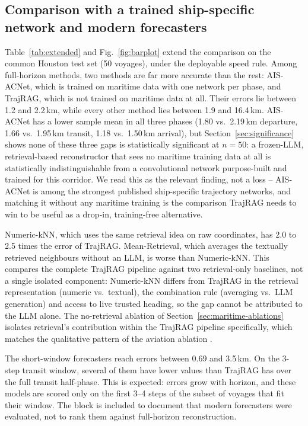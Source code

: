 \subsection{Comparison with a trained ship-specific network and modern forecasters}
\label{sec:extended-comparison}

Table~\ref{tab:extended} and Fig.~\ref{fig:barplot} extend the comparison on
the common Houston test set (50 voyages), under the deployable speed rule.
Among full-horizon methods, two methods are far more accurate than the
rest: AIS-ACNet, which is trained on maritime data with one network per
phase, and TrajRAG, which is not trained on maritime data at all. Their
errors lie between 1.2 and 2.2\,km, while every other method lies between
1.9 and 16.4\,km. AIS-ACNet has a lower sample mean in all three phases
(1.80 vs.\ 2.19\,km departure, 1.66 vs.\ 1.95\,km transit, 1.18 vs.\
1.50\,km arrival), but Section~\ref{sec:significance} shows none of these
three gaps is statistically significant at $n=50$: a frozen-LLM,
retrieval-based reconstructor that sees no maritime training data at all is
statistically indistinguishable from a convolutional network purpose-built
and trained for this corridor. We read this as the relevant finding, not a
loss -- AIS-ACNet is among the strongest published ship-specific
trajectory networks, and matching it without any maritime training is the
comparison TrajRAG needs to win to be useful as a drop-in, training-free
alternative.

Numeric-kNN, which uses the same retrieval idea on raw coordinates, has 2.0
to 2.5 times the error of TrajRAG. Mean-Retrieval, which averages the
textually retrieved neighbours without an LLM, is worse than Numeric-kNN.
This compares the complete TrajRAG pipeline against two retrieval-only
baselines, not a single isolated component: Numeric-kNN differs from
TrajRAG in the retrieval representation (numeric vs.\ textual), the
combination rule (averaging vs.\ LLM generation) and access to live trusted
heading, so the gap cannot be attributed to the LLM alone. The no-retrieval
ablation of Section~\ref{sec:maritime-ablations} isolates retrieval's
contribution within the TrajRAG pipeline specifically, which matches the
qualitative pattern of the aviation ablation \citep{felendler2026trajrag}.

The short-window forecasters reach errors between 0.69 and 3.5\,km. On the
3-step transit window, several of them have lower values than TrajRAG has
over the full transit half-phase. This is expected: errors grow with
horizon, and these models are scored only on the first 3--4 steps of the
subset of voyages that fit their window. The block is included to document
that modern forecasters were evaluated, not to rank them against full-horizon
reconstruction.

